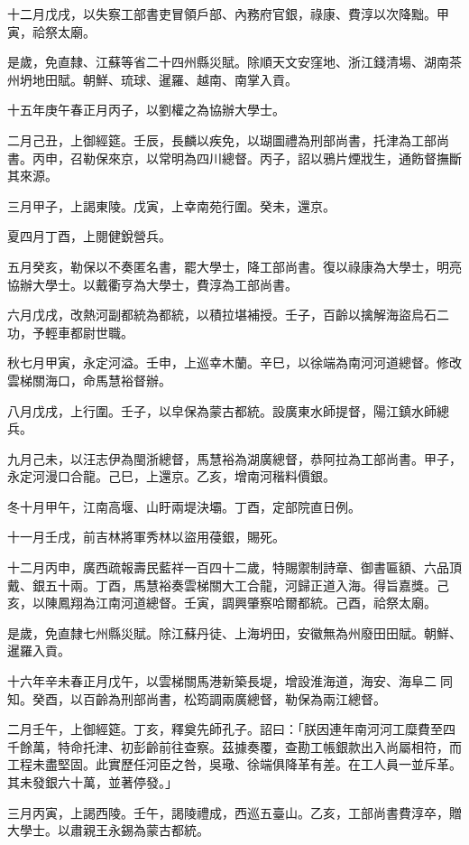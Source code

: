 \begin{pinyinscope}
十二月戊戌，以失察工部書吏冒領戶部、內務府官銀，祿康、費淳以次降黜。甲寅，祫祭太廟。

是歲，免直隸、江蘇等省二十四州縣災賦。除順天文安窪地、浙江錢清場、湖南茶州坍地田賦。朝鮮、琉球、暹羅、越南、南掌入貢。

十五年庚午春正月丙子，以劉權之為協辦大學士。

二月己丑，上御經筵。壬辰，長麟以疾免，以瑚圖禮為刑部尚書，托津為工部尚書。丙申，召勒保來京，以常明為四川總督。丙子，詔以鴉片煙戕生，通飭督撫斷其來源。

三月甲子，上謁東陵。戊寅，上幸南苑行圍。癸未，還京。

夏四月丁酉，上閱健銳營兵。

五月癸亥，勒保以不奏匿名書，罷大學士，降工部尚書。復以祿康為大學士，明亮協辦大學士。以戴衢亨為大學士，費淳為工部尚書。

六月戊戌，改熱河副都統為都統，以積拉堪補授。壬子，百齡以擒解海盜烏石二功，予輕車都尉世職。

秋七月甲寅，永定河溢。壬申，上巡幸木蘭。辛巳，以徐端為南河河道總督。修改雲梯關海口，命馬慧裕督辦。

八月戊戌，上行圍。壬子，以皁保為蒙古都統。設廣東水師提督，陽江鎮水師總兵。

九月己未，以汪志伊為閩浙總督，馬慧裕為湖廣總督，恭阿拉為工部尚書。甲子，永定河漫口合龍。己巳，上還京。乙亥，增南河稭料價銀。

冬十月甲午，江南高堰、山盱兩堤決壩。丁酉，定部院直日例。

十一月壬戌，前吉林將軍秀林以盜用葠銀，賜死。

十二月丙申，廣西疏報壽民藍祥一百四十二歲，特賜禦制詩章、御書匾額、六品頂戴、銀五十兩。丁酉，馬慧裕奏雲梯關大工合龍，河歸正道入海。得旨嘉獎。己亥，以陳鳳翔為江南河道總督。壬寅，調興肇察哈爾都統。己酉，祫祭太廟。

是歲，免直隸七州縣災賦。除江蘇丹徒、上海坍田，安徽無為州廢田田賦。朝鮮、暹羅入貢。

十六年辛未春正月戊午，以雲梯關馬港新築長堤，增設淮海道，海安、海阜二同知。癸酉，以百齡為刑部尚書，松筠調兩廣總督，勒保為兩江總督。

二月壬午，上御經筵。丁亥，釋奠先師孔子。詔曰：「朕因連年南河河工糜費至四千餘萬，特命托津、初彭齡前往查察。茲據奏覆，查勘工帳銀款出入尚屬相符，而工程未盡堅固。此實歷任河臣之咎，吳璥、徐端俱降革有差。在工人員一並斥革。其未發銀六十萬，並著停發。」

三月丙寅，上謁西陵。壬午，謁陵禮成，西巡五臺山。乙亥，工部尚書費淳卒，贈大學士。以肅親王永錫為蒙古都統。


\end{pinyinscope}
